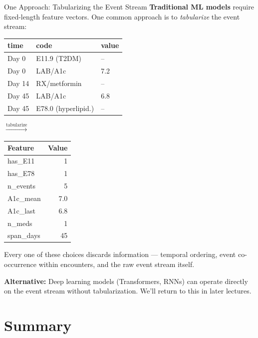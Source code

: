 \documentclass[aspectratio=169,10pt]{beamer}
\begin{document}

\begin{frame}{One Approach: Tabularizing the Event Stream}
\textbf{Traditional ML models} require fixed-length feature vectors. One common approach is to \emph{tabularize} the event stream:

\vspace{0.3em}
\begin{center}
\scriptsize
\begin{tabular}{lll}
\toprule
\textbf{time} & \textbf{code} & \textbf{value} \\
\midrule
Day 0 & E11.9 (T2DM) & -- \\
Day 0 & LAB/A1c & 7.2 \\
Day 14 & RX/metformin & -- \\
Day 45 & LAB/A1c & 6.8 \\
Day 45 & E78.0 (hyperlipid.) & -- \\
\bottomrule
\end{tabular}
\quad$\xrightarrow{\text{tabularize}}$\quad
\begin{tabular}{lr}
\toprule
\textbf{Feature} & \textbf{Value} \\
\midrule
has\_E11 & 1 \\
has\_E78 & 1 \\
n\_events & 5 \\
A1c\_mean & 7.0 \\
A1c\_last & 6.8 \\
n\_meds & 1 \\
span\_days & 45 \\
\bottomrule
\end{tabular}
\end{center}

\vspace{0.3em}
\alert{Every one of these choices discards information} --- temporal ordering, event co-occurrence within encounters, and the raw event stream itself.

\vspace{0.3em}
\textbf{Alternative:} Deep learning models (Transformers, RNNs) can operate directly on the event stream without tabularization. We'll return to this in later lectures.
\end{frame}







\section{Summary}
\end{document}
